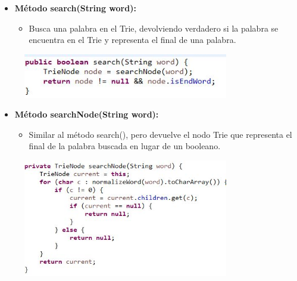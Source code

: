 \documentclass{article}
\begin{document}
	\begin{itemize}
	\item \textbf{Método search(String word):}
	 \begin{itemize}
	 \item Busca una palabra en el Trie, devolviendo verdadero si la palabra se encuentra en el Trie y representa el final de una palabra.
	 \end{itemize}
	\end{itemize}
	 \begin{figure}[H]
		\centering
		\includegraphics[width=0.8\textwidth,keepaspectratio]{img/TN3.jpg}
	\end{figure}
	\clearpage
	
	\begin{itemize}
	\item \textbf{Método searchNode(String word):}
	 \begin{itemize}
	 \item Similar al método search(), pero devuelve el nodo Trie que representa el final de la palabra buscada en lugar de un booleano.
	 \end{itemize}
	\end{itemize}
	 \begin{figure}[H]
		\centering
		\includegraphics[width=0.8\textwidth,keepaspectratio]{img/TN4.jpg}
	\end{figure}	
	
\end{document}

